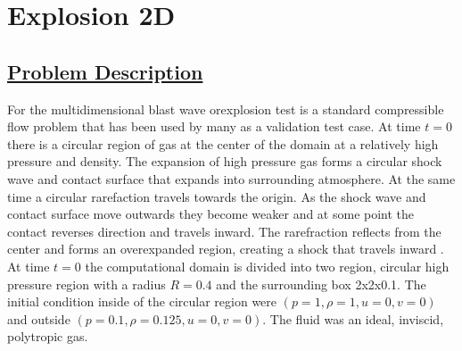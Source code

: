 \section*{\center Explosion 2D}
\subsection*{\underline{Problem Description}}
For the multidimensional blast wave orexplosion test is a standard compressible
flow problem that has been used by many as a validation test case.  At time
$t=0$ there is a circular region of gas at the center of the domain at a
relatively high pressure and density.  The expansion of high pressure gas
forms a circular shock wave and contact surface that expands into surrounding
atmosphere.  At the same time a circular rarefaction travels towards the
origin.  As the shock wave and contact surface move outwards they become
weaker and at some point the contact reverses direction and travels inward.
The rarefraction reflects from the center and forms an overexpanded region,
creating a shock that travels inward \cite{ref:toro}.  At time $t=0$ the
computational domain is divided into two region, circular high pressure region
with a radius $R=0.4$ and the surrounding box 2x2x0.1.  The initial condition
inside of the circular region were $(p=1, \rho=1, u=0, v=0)$  and outside
$(p=0.1, \rho=0.125, u=0, v=0).$  The fluid was an ideal, inviscid, polytropic gas.
%
